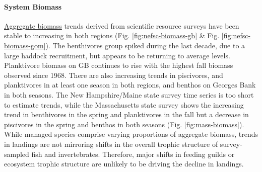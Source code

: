 \documentclass[
  10pt,
]{article}
\begin{document}
\hypertarget{system-biomass}{%
\paragraph{System Biomass}\label{system-biomass}}

\href{https://noaa-edab.github.io/catalog/aggregate_biomass.html}{Aggregate biomass} trends derived from scientific resource surveys have been stable to increasing in both regions (Fig. \ref{fig:nefsc-biomass-gb} \& Fig. \ref{fig:nefsc-biomass-gom}). The benthivores group spiked during the last decade, due to a large haddock recruitment, but appears to be returning to average levels. Planktivore biomass on GB continues to rise with the highest fall biomass observed since 1968. There are also increasing trends in piscivores, and planktivores in at least one season in both regions, and benthos on Georges Bank in both seasons. The New Hampshire/Maine state survey time series is too short to estimate trends, while the Massachusetts state survey shows the increasing trend in benthivores in the spring and planktivores in the fall but a decrease in piscivores in the spring and benthos in both seasons (Fig. \ref{fig:mass-biomass}). While managed species comprise varying proportions of aggregate biomass, trends in landings are not mirroring shifts in the overall trophic structure of survey-sampled fish and invertebrates. Therefore, major shifts in feeding guilds or ecosystem trophic structure are unlikely to be driving the decline in landings.

\providecommand{\docline}[3]{\noalign{\global\setlength{\arrayrulewidth}{#1}}\arrayrulecolor[HTML]{#2}\cline{#3}}

\setlength{\tabcolsep}{2pt}

\renewcommand*{\arraystretch}{1}
\end{document}
